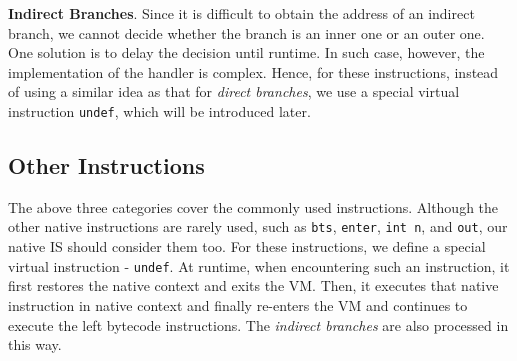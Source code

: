 \textbf{Indirect Branches}. Since it is difficult to obtain the address of an indirect branch, we cannot decide whether the branch is an inner one or an outer one. One solution is to delay the decision until runtime. In such case, however, the implementation of the handler is complex. Hence, for these instructions, instead of using a similar idea as that for \textit{direct branches}, we use a special virtual instruction \texttt{undef}, which will be introduced later.

\subsection{Other Instructions}
The above three categories cover the commonly used instructions. Although the other native instructions are rarely used, such as \texttt{bts}, \texttt{enter}, \texttt{int n}, and \texttt{out}, our native IS should consider them too. For these instructions, we define a special virtual instruction - \texttt{undef}. At runtime, when encountering such an instruction, it first restores the native context and exits the VM. Then, it executes that native instruction in native context and finally re-enters the VM and continues to execute the left bytecode instructions. The \textit{indirect branches} are also processed in this way.

